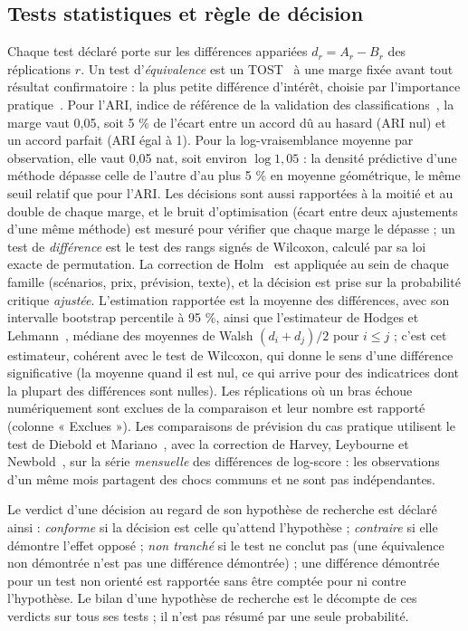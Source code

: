 \subsection{Tests statistiques et règle de décision}\label{sec:decision}
Chaque test déclaré porte sur les différences appariées $d_r = A_r - B_r$ des réplications $r$. Un test d'\emph{équivalence} est un TOST~\cite{schuirmann1987} à une marge fixée avant tout résultat confirmatoire : la plus petite différence d'intérêt, choisie par l'importance pratique~\cite{lakens2017,lakens2018}. Pour l'ARI, indice de référence de la validation des classifications~\cite{steinley2004}, la marge vaut 0,05, soit 5 \% de l'écart entre un accord dû au hasard (ARI nul) et un accord parfait (ARI égal à 1). Pour la log-vraisemblance moyenne par observation, elle vaut 0,05 nat, soit environ $\log 1{,}05$ : la densité prédictive d'une méthode dépasse celle de l'autre d'au plus 5 \% en moyenne géométrique, le même seuil relatif que pour l'ARI. Les décisions sont aussi rapportées à la moitié et au double de chaque marge, et le bruit d'optimisation (écart entre deux ajustements d'une même méthode) est mesuré pour vérifier que chaque marge le dépasse ; un test de \emph{différence} est le test des rangs signés de Wilcoxon, calculé par sa loi exacte de permutation. La correction de Holm~\cite{holm1979} est appliquée au sein de chaque famille (scénarios, prix, prévision, texte), et la décision est prise sur la probabilité critique \emph{ajustée}. L'estimation rapportée est la moyenne des différences, avec son intervalle bootstrap percentile à 95 \%, ainsi que l'estimateur de Hodges et Lehmann~\cite{hodges1963}, médiane des moyennes de Walsh $(d_i + d_j)/2$ pour $i \leq j$ ; c'est cet estimateur, cohérent avec le test de Wilcoxon, qui donne le sens d'une différence significative (la moyenne quand il est nul, ce qui arrive pour des indicatrices dont la plupart des différences sont nulles). Les réplications où un bras échoue numériquement sont exclues de la comparaison et leur nombre est rapporté (colonne « Exclues »). Les comparaisons de prévision du cas pratique utilisent le test de Diebold et Mariano~\cite{diebold1995}, avec la correction de Harvey, Leybourne et Newbold~\cite{harvey1997}, sur la série \emph{mensuelle} des différences de log-score : les observations d'un même mois partagent des chocs communs et ne sont pas indépendantes.

Le verdict d'une décision au regard de son hypothèse de recherche est déclaré ainsi : \emph{conforme} si la décision est celle qu'attend l'hypothèse ; \emph{contraire} si elle démontre l'effet opposé ; \emph{non tranché} si le test ne conclut pas (une équivalence non démontrée n'est pas une différence démontrée) ; une différence démontrée pour un test non orienté est rapportée sans être comptée pour ni contre l'hypothèse. Le bilan d'une hypothèse de recherche est le décompte de ces verdicts sur tous ses tests ; il n'est pas résumé par une seule probabilité.

